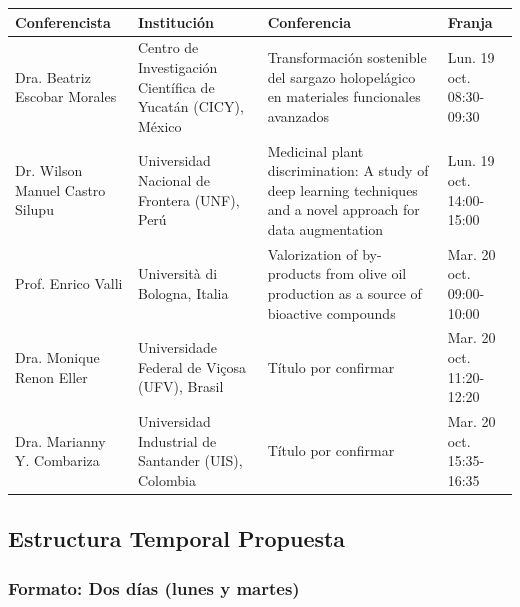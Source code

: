\documentclass[12pt,a4paper]{article}
\begin{document}
\begin{table}[H]
\centering
\small
\begin{tabular}{|>{\raggedright\arraybackslash}p{3.3cm}|>{\raggedright\arraybackslash}p{3.3cm}|>{\raggedright\arraybackslash}p{5.2cm}|>{\raggedright\arraybackslash}p{2.2cm}|}
\hline
\rowcolor{verdeclaro}
\textbf{Conferencista} & \textbf{Institución} & \textbf{Conferencia} & \textbf{Franja} \\
\hline
Dra. Beatriz Escobar Morales & Centro de Investigación Científica de Yucatán (CICY), México & Transformación sostenible del sargazo holopelágico en materiales funcionales avanzados & Lun. 19 oct. 08:30-09:30 \\
\hline
Dr. Wilson Manuel Castro Silupu & Universidad Nacional de Frontera (UNF), Perú & Medicinal plant discrimination: A study of deep learning techniques and a novel approach for data augmentation & Lun. 19 oct. 14:00-15:00 \\
\hline
Prof. Enrico Valli & Università di Bologna, Italia & Valorization of by-products from olive oil production as a source of bioactive compounds & Mar. 20 oct. 09:00-10:00 \\
\hline
Dra. Monique Renon Eller & Universidade Federal de Viçosa (UFV), Brasil & Título por confirmar & Mar. 20 oct. 11:20-12:20 \\
\hline
Dra. Marianny Y. Combariza & Universidad Industrial de Santander (UIS), Colombia & Título por confirmar & Mar. 20 oct. 15:35-16:35 \\
\hline
\end{tabular}
\end{table}

\newpage
\subsection{Estructura Temporal Propuesta}

\subsubsection{Formato: Dos días (lunes y martes)}
\end{document}
